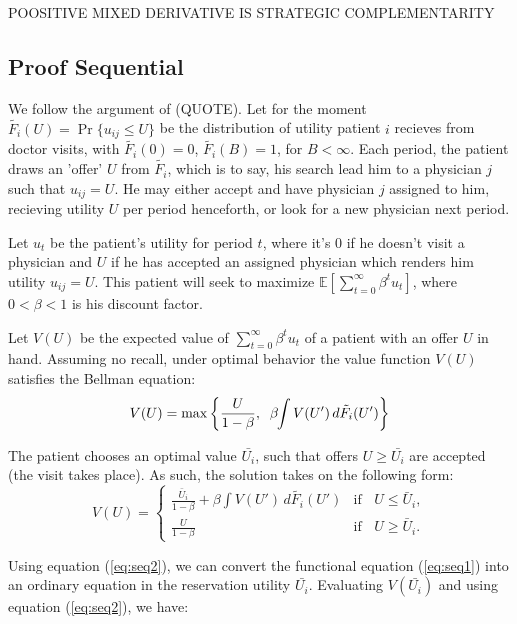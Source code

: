 \documentclass[../main.tex]{subfiles}
\begin{document}
POOSITIVE MIXED DERIVATIVE IS STRATEGIC COMPLEMENTARITY

\subsection{Proof Sequential}

We follow the argument of (QUOTE). Let for the moment $\tilde{F_i}(U) = \operatorname{Pr}\{u_{ij} \leq U\}$ be the distribution of utility patient $i$ recieves from doctor visits, with $\tilde{F_i}(0) = 0$, $\tilde{F_i}(B) = 1$, for $B < \infty$. Each period, the patient draws an 'offer' $U$ from $\tilde{F_i}$, which is to say, his search lead him to a physician $j$ such that $u_{ij} = U$. He may either accept and have physician $j$ assigned to him, recieving utility $U$ per period henceforth, or look for a new physician next period.

Let $u_t$ be the patient's utility for period $t$, where it's $0$ if he doesn't visit a physician and $U$ if he has accepted an assigned physician which renders him utility $u_{ij} = U$. This patient will seek to maximize $\mathbb{E}[\sum_{t=0}^{\infty} \beta^t u_t]$, where $0 < \beta < 1$ is his discount factor.

Let $V(U)$ be the expected value of $\sum_{t=0}^{\infty} \beta^t u_t$ of a patient with an offer $U$ in hand. Assuming no recall, under optimal behavior the value function $V(U)$ satisfies the Bellman equation:
\begin{equation}
    V(U) = \max \left\{ \frac{U}{1 - \beta},\; \;\beta \hspace{-0.1cm}\int V(U') \, d \tilde{F_i}(U') \right\}
    \label{eq:seq1} 
\end{equation}

The patient chooses an optimal value $\bar{U_i}$, such that offers $U \geq \bar{U_i}$ are accepted (the visit takes place). As such, the solution takes on the following form:
\begin{equation}
    V(U) = \begin{cases}
        \frac{\bar{U}_i}{1 - \beta} + \beta \int V(U') \, d \tilde{F_i}(U') & \text{if }\; \; U \leq \bar{U}_i, \\[0.5em]
        \frac{U}{1 - \beta} & \text{if } \; \; U \geq \bar{U}_i.
    \end{cases}
\label{eq:seq2} 
\end{equation}

Using equation (\ref{eq:seq2}), we can convert the functional equation (\ref{eq:seq1}) into an ordinary equation in the reservation utility $\bar{U_i}$. Evaluating $V(\bar{U_i})$ and using equation (\ref{eq:seq2}), we have:
\end{document}

